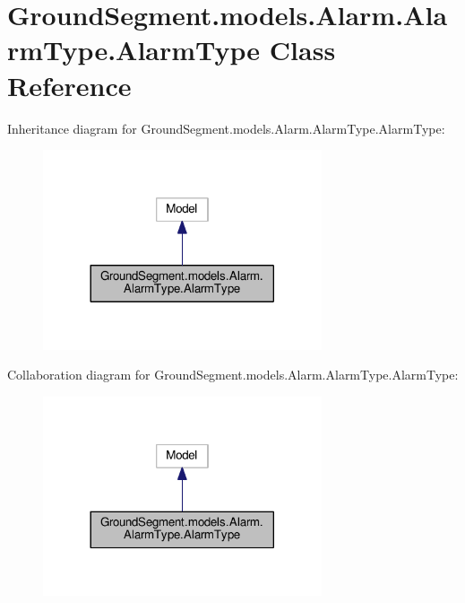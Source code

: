 \hypertarget{class_ground_segment_1_1models_1_1_alarm_1_1_alarm_type_1_1_alarm_type}{}\section{Ground\+Segment.\+models.\+Alarm.\+Alarm\+Type.\+Alarm\+Type Class Reference}
\label{class_ground_segment_1_1models_1_1_alarm_1_1_alarm_type_1_1_alarm_type}


Inheritance diagram for Ground\+Segment.\+models.\+Alarm.\+Alarm\+Type.\+Alarm\+Type\+:\nopagebreak
\begin{figure}[H]
\begin{center}
\leavevmode
\includegraphics[width=233pt]{class_ground_segment_1_1models_1_1_alarm_1_1_alarm_type_1_1_alarm_type__inherit__graph}
\end{center}
\end{figure}


Collaboration diagram for Ground\+Segment.\+models.\+Alarm.\+Alarm\+Type.\+Alarm\+Type\+:\nopagebreak
\begin{figure}[H]
\begin{center}
\leavevmode
\includegraphics[width=233pt]{class_ground_segment_1_1models_1_1_alarm_1_1_alarm_type_1_1_alarm_type__coll__graph}
\end{center}
\end{figure}
